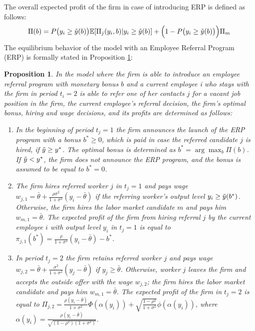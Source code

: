\documentclass[12pt]{article}
\newtheorem{proposition}{Proposition}
\begin{document}
The overall expected profit of the firm in case of introducing ERP is defined as follows:
\begin{equation}\label{eq:profit_overal_erp}
    \Pi(b) = P\bigl(y_i \geq \Tilde{y}(b)\bigr) \mathbb{E}[\Pi_j(y_i, b)| y_i \geq \Tilde{y}(b)] + \Bigl(1-P\bigl(y_i \geq \Tilde{y}(b)\bigr)\Bigr)\Pi_m
\end{equation}
The equilibrium behavior of the model with an Employee Referral Program (ERP) is formally stated in Proposition \ref{prop:eq_erp}:
\begin{proposition}\label{prop:eq_erp}
    In the model where the firm is able to introduce an employee referral program with monetary bonus $b$ and a current employee i who stays with the firm in period $t_i = 2$ is able to refer one of her contacts $j$ for a vacant job position in the firm, the current employee’s referral decision, the firm’s optimal bonus, hiring and wage decisions, and its profits are determined as follows:
    \begin{enumerate}[label={\roman*})]
        \item In the beginning of period $t_j = 1$ the firm announces the launch of the ERP program with a bonus $b^* \geq 0$, which is paid in case the referred candidate $j$ is hired, if $\Tilde{y} \geq y^*$. The optimal bonus is determined as $b^*=\arg\max_{b}\Pi(b)$. If $\Tilde{y} < y^*$, the firm does not announce the ERP program, and the bonus is assumed to be equal to $b^* = 0$.
		\item The firm hires referred worker $j$ in $t_j = 1$ and pays wage $w_{j,1} = \bar{\theta}+\frac{\rho \sigma^2}{1+\sigma^2} \left(y_i - \bar{\theta}\right)$ if the referring worker's output level $y_i \geq \Tilde{y}(b^*)$. Otherwise, the firm hires the labor market candidate $m$ and pays him $w_{m,1} = \bar{\theta}$. The expected profit of the firm from hiring referral $j$ by the current employee $i$ with output level $y_i$ in $t_j = 1$ is equal to $\pi_{j,1}(b^*) = \frac{\rho}{1+\sigma^2}\left(y_i - \bar{\theta}\right)-b^*$.
        \item In period $t_j = 2$ the firm retains referred worker $j$ and pays wage $w_{j,2} = \bar{\theta} + \frac{\sigma^2}{1+\sigma^2}\left( y_j - \bar{\theta} \right)$ if $y_j \geq \bar{\theta}$. Otherwise, worker $j$ leaves the firm and accepts the outside offer with the wage $w_{j,2}$; the firm hires the labor market candidate and pays him $w_{m,1} = \bar{\theta}$. The expected profit of the firm in $t_j = 2$ is equal to $\Pi_{j,2} = \frac{\rho\left(y_i-\bar{\theta}\right)}{1+\sigma^2}\Phi(\alpha(y_i))
        +\sqrt{\frac{1-\rho^2}{1+\sigma^2}}\phi(\alpha(y_i))$, where $\alpha (y_i) = \frac{\rho\left(y_i - \bar{\theta}\right)}{\sqrt{(1-\rho^2)(1+\sigma^2)}}$.
	\end{enumerate}
\end{proposition}
\end{document}

